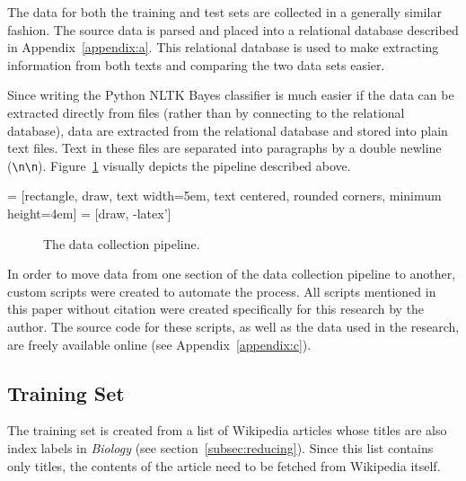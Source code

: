 The data for both the training and test sets are collected in a generally similar fashion.
The source data is parsed and placed into a relational database described in Appendix~\ref{appendix:a}.
This relational database is used to make extracting information from both texts and comparing the two data sets easier.

Since writing the Python NLTK \naive Bayes classifier is much easier if the data can be extracted directly from files (rather than by connecting to the relational database), data are extracted from the relational database and stored into plain text files.
Text in these files are separated into paragraphs by a double newline ({\tt \textbackslash n\textbackslash n}).
Figure~\ref{fig:pipeline} visually depicts the pipeline described above.

 = [rectangle, draw, 
    text width=5em, text centered, rounded corners, minimum height=4em]
 = [draw, -latex']

\begin{figure}[H]
\begin{center}
\caption{The data collection pipeline.}
\label{fig:pipeline}
\end{center}
\end{figure}

In order to move data from one section of the data collection pipeline to another, custom scripts were created to automate the process.
All scripts mentioned in this paper without citation were created specifically for this research by the author.
The source code for these scripts, as well as the data used in the research, are freely available online (see Appendix~\ref{appendix:c}).

\subsection{Training Set}
\label{subsec:training-set}

The training set is created from a list of Wikipedia articles whose titles are also index labels in {\it Biology} (see section~\ref{subsec:reducing}).
Since this list contains only titles, the contents of the article need to be fetched from Wikipedia itself.

